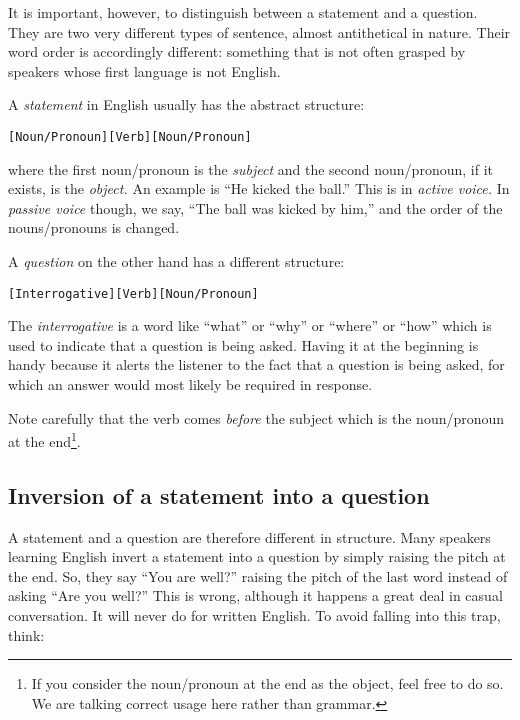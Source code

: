 \documentclass[
  12pt,
  a4paper,
]{article}
\newcommand\noun[1]{\textcolor{noun}{#1}}
\newcommand\pronoun[1]{\textcolor{pronoun}{#1}}
\newcommand\action[1]{\textcolor{action}{#1}}
\begin{document}
It is important, however, to distinguish between a statement and a
question. They are two very different types of sentence, almost
antithetical in nature. Their word order is accordingly different:
something that is not often grasped by speakers whose first language is
not English.

A \emph{statement} in English usually has the abstract structure:

\begin{tcolorbox}
\begin{alltt}
\color{normal}
[\noun{Noun}/\pronoun{Pronoun}] [\action{Verb}] [\noun{Noun}/\pronoun{Pronoun}]
\end{alltt}
\end{tcolorbox}

where the first noun/pronoun is the \emph{subject} and the second
noun/pronoun, if it exists, is the \emph{object.} An example is ``He
kicked the ball.'' This is in \emph{active voice.} In \emph{passive
voice} though, we say, ``The ball was kicked by him,'' and the order of
the nouns/pronouns is changed.

A \emph{question} on the other hand has a different structure:

\begin{tcolorbox}
\begin{alltt}
\color{normal}
[Interrogative] [\action{Verb}] [\noun{Noun}/\pronoun{Pronoun}]
\end{alltt}
\end{tcolorbox}

The \emph{interrogative} is a word like ``what'' or ``why'' or ``where''
or ``how'' which is used to indicate that a question is being asked.
Having it at the beginning is handy because it alerts the listener to
the fact that a question is being asked, for which an answer would most
likely be required in response.

Note carefully that the verb comes \emph{before} the subject which is
the noun/pronoun at the end\footnote{If you consider the noun/pronoun at
  the end as the object, feel free to do so. We are talking correct
  usage here rather than grammar.}.

\hypertarget{inversion-of-a-statement-into-a-question}{%
\subsection{Inversion of a statement into a
question}\label{inversion-of-a-statement-into-a-question}}

A statement and a question are therefore different in structure. Many
speakers learning English invert a statement into a question by simply
raising the pitch at the end. So, they say ``You are well?'' raising the
pitch of the last word instead of asking ``Are you well?'' This is
wrong, although it happens a great deal in casual conversation. It will
never do for written English. To avoid falling into this trap, think:
\end{document}
